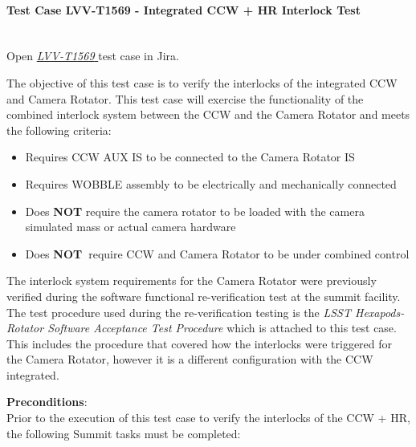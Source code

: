 \documentclass[SE,lsstdraft,STR,toc]{lsstdoc}
\providecommand{\tightlist}{
  \setlength{\itemsep}{0pt}\setlength{\parskip}{0pt}}
\begin{document}
\paragraph{Test Case LVV-T1569 - Integrated CCW + HR Interlock Test
 }\mbox{}\\

Open  \href{https://jira.lsstcorp.org/secure/Tests.jspa#/testCase/LVV-T1569}{\textit{ LVV-T1569 } }
test case in Jira.

The objective of this test case is to verify the interlocks of the
integrated CCW and Camera Rotator. This test case will exercise the
functionality of the combined interlock system between the CCW and the
Camera Rotator and meets the following criteria:

\begin{itemize}
\tightlist
\item
  Requires CCW AUX IS to be connected to the Camera Rotator IS
\item
  Requires WOBBLE assembly to be electrically and mechanically connected
\item
  Does \textbf{NOT} require the camera rotator to be loaded with the
  camera simulated mass or actual camera hardware
\item
  Does \textbf{NOT~}require CCW and Camera Rotator to be under combined
  control
\end{itemize}

The interlock system requirements for the Camera Rotator were previously
verified during the software functional re-verification test at the
summit facility. The test procedure used during the re-verification
testing is the \emph{LSST Hexapods-Rotator Software Acceptance Test
Procedure} which is attached to this test case. This includes the
procedure that covered how the interlocks were triggered for the Camera
Rotator, however it is a different configuration with the CCW
integrated.


\textbf{ Preconditions}:\\
Prior to the execution of this test case to verify the interlocks of the
CCW + HR, the following Summit tasks must be completed:\\
\end{document}
